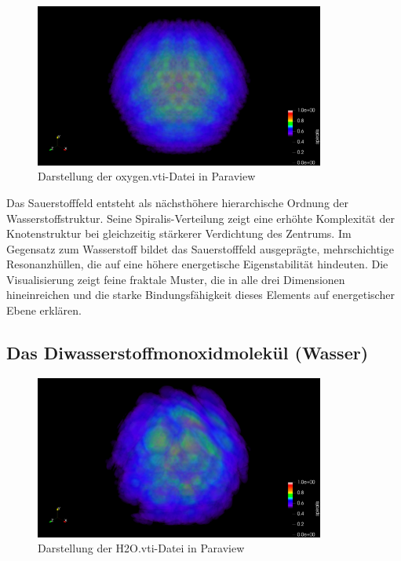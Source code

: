 \begin{figure}
  \centering
  \includegraphics[width=0.85\textwidth]{Grafiken/05_Visualisierung/O/O_Volume_XYZ_Cam.jpeg}
  \caption{Darstellung der oxygen.vti-Datei in Paraview}
  \label{fig:O}
\end{figure}

Das Sauerstofffeld entsteht als nächsthöhere hierarchische Ordnung der Wasserstoffstruktur. 
Seine Spiralis-Verteilung zeigt eine erhöhte Komplexität der Knotenstruktur bei gleichzeitig stärkerer Verdichtung des Zentrums. 
Im Gegensatz zum Wasserstoff bildet das Sauerstofffeld ausgeprägte, mehrschichtige Resonanzhüllen, die auf eine höhere energetische Eigenstabilität hindeuten.
Die Visualisierung zeigt feine fraktale Muster, die in alle drei Dimensionen hineinreichen und die starke Bindungsfähigkeit dieses Elements auf energetischer Ebene erklären.

\newpage

\subsection{Das Diwasserstoffmonoxidmolekül (Wasser)}

\begin{figure}
  \centering
  \includegraphics[width=0.85\textwidth]{Grafiken/05_Visualisierung/H2O/H20_Volume_XYZ_Cam.jpeg}
  \caption{Darstellung der H2O.vti-Datei in Paraview}
  \label{fig:H2O}
\end{figure}

